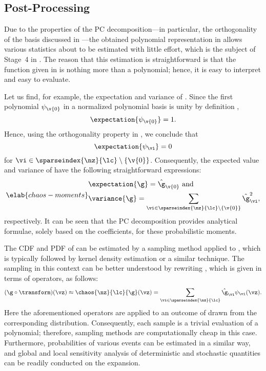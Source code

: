 \subsection{Post-Processing}

Due to the properties of the \ac{PC} decomposition---in particular, the
orthogonality of the basis discussed in ---the obtained
polynomial representation in  allows various statistics
about \g to be estimated with little effort, which is the subject of Stage~4 in
. The reason that this estimation is straightforward is
that the function given in  is nothing more than a
polynomial; hence, it is easy to interpret and easy to evaluate.

Let us find, for example, the expectation and variance of \g. Since the first
polynomial $\psi_{\v{0}}$ in a normalized polynomial basis is unity by
definition \cite{xiu2010},
\[
  \expectation{\psi_{\v{0}}} = 1.
\]
Hence, using the orthogonality property in , we
conclude that
\[
  \expectation{\psi_{\vi}} = 0
\]
for $\vi \in \sparseindex{\nz}{\lc} \setminus \{ \v{0} \}$. Consequently, the
expected value and variance of \g have the following straightforward
expressions:
\begin{equation} \elab{chaos-moments}
  \begin{split}
    & \expectation{\g} = \hat{\g}_{\v{0}} \text{ and} \\
    & \variance{\g} = \sum_{\vi \in \sparseindex{\nz}{\lc} \setminus \{ \v{0} \}} \hat{\g}_{\vi}^2,
  \end{split}
\end{equation}
respectively. It can be seen that the \ac{PC} decomposition provides analytical
formulae, solely based on the coefficients, for these probabilistic moments.

The \ac{CDF} and \ac{PDF} of \g can be estimated by a sampling method applied to
, which is typically followed by kernel density estimation
\cite{hastie2013} or a similar technique. The sampling in this context can be
better understood by rewriting , which is given in terms
of operators, as follows:
\[
  (\g \circ \transform)(\vz) \approx \chaos{\nz}{\lc}{\g}(\vz)
  = \sum_{\vi \in \sparseindex{\nz}{\lc}} \hat{\g}_{\vi} \psi_{\vi}(\vz).
\]
Here the aforementioned operators are applied to an outcome of \vz drawn from
the corresponding distribution. Consequently, each sample is a trivial
evaluation of a polynomial; therefore, sampling methods are computationally
cheap in this case. Furthermore, probabilities of various events can be
estimated in a similar way, and global and local sensitivity analysis of
deterministic and stochastic quantities can be readily conducted on the
expansion.

